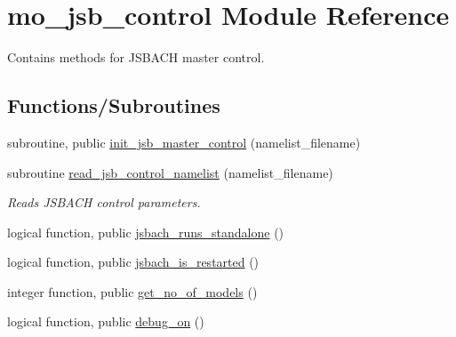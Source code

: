 \hypertarget{namespacemo__jsb__control}{}\section{mo\+\_\+jsb\+\_\+control Module Reference}
\label{namespacemo__jsb__control}


Contains methods for J\+S\+B\+A\+C\+H master control.  


\subsection*{Functions/\+Subroutines}
\begin{DoxyCompactItemize}
\item 
subroutine, public \hyperlink{namespacemo__jsb__control_a6090e428421fd94a977d2962605f4b85}{init\+\_\+jsb\+\_\+master\+\_\+control} (namelist\+\_\+filename)
\item 
subroutine \hyperlink{namespacemo__jsb__control_a7096485a9080a52ed242f5e352a810db}{read\+\_\+jsb\+\_\+control\+\_\+namelist} (namelist\+\_\+filename)
\begin{DoxyCompactList}\small\item\em Reads J\+S\+B\+A\+C\+H control parameters. \end{DoxyCompactList}\item 
logical function, public \hyperlink{namespacemo__jsb__control_a6ca5c01f6a6fd0446629cad234309fe2}{jsbach\+\_\+runs\+\_\+standalone} ()
\item 
logical function, public \hyperlink{namespacemo__jsb__control_a39662ac8e16fc4e50c7f42118f788dff}{jsbach\+\_\+is\+\_\+restarted} ()
\item 
integer function, public \hyperlink{namespacemo__jsb__control_ad3ab17f12f0cd28d5d8007f04a8f0cf2}{get\+\_\+no\+\_\+of\+\_\+models} ()
\item 
logical function, public \hyperlink{namespacemo__jsb__control_a5712e1cd2e5736d1d7e6a59707af0200}{debug\+\_\+on} ()
\end{DoxyCompactItemize}

